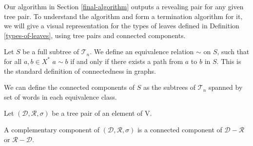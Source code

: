\documentclass[12pt]{amsart}
\newcommand{\T}{\mathcal{T}}
\newcommand{\tn}{\T_n}
\newcommand{\D}{\mathcal{D}}
\newcommand{\R}{\mathcal{R}}
\begin{document}
        Our algorithm in Section \ref{final-algorithm} outputs a revealing pair for any given tree pair. To understand the algorithm and form a termination algorithm for it, we will give a visual representation for the types of leaves defined in Definition \ref{types-of-leaves}, using tree pairs and connected components.
        
        \begin{definition}
            Let $S$ be a full subtree of $\tn$. We define an equivalence relation $\sim$ on $S$, such that for all $a,b \in X^*$  $a \sim b$ if and only if there exists a path from $a$ to $b$ in $S$. This is the standard definition of connectedness in graphs.
            
            We can define the connected components of $S$ as the subtrees of $\tn$ spanned by set of words in each equivalence class.
        \end{definition}
        
        \begin{definition}
            Let $(\D,\R, \sigma)$ be a tree pair of an element of V.
            
            A complementary component of $(\D,\R, \sigma)$ is a connected component of $\D-\R$ or $\R-\D$.
        \end{definition}
        
\end{document}
